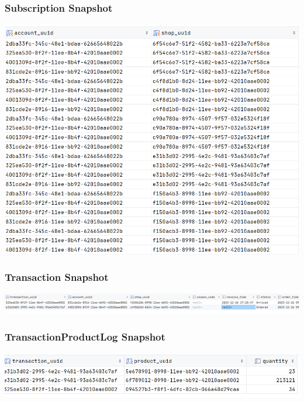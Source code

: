 \documentclass[a4paper, 12pt]{article}
\begin{document}
\subsubsection{Subscription Snapshot}
\includegraphics[scale=0.4]{snapshots/subscription.png}
\subsubsection{Transaction Snapshot}
\includegraphics[scale=0.4]{snapshots/transaction.png}
\subsubsection{TransactionProductLog Snapshot}
\includegraphics[scale=0.4]{snapshots/transactionProductLog.png}
\newpage
\end{document}
